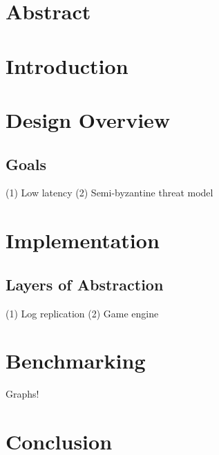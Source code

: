 \documentclass[11pt]{article}
\begin{document}
\section{Abstract}

\section{Introduction}

\section{Design Overview}

\subsection{Goals}

(1) Low latency
(2) Semi-byzantine threat model

\section{Implementation}

\subsection{Layers of Abstraction}

(1) Log replication
(2) Game engine

\section{Benchmarking}

Graphs!

\section{Conclusion}

{}

\end{document}
